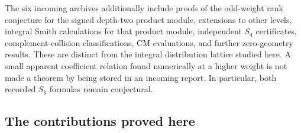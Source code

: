 The six incoming archives additionally include proofs of the odd-weight
rank conjecture for the signed depth-two product module, extensions to
other levels, integral Smith calculations for that product module,
independent $S_4$ certificates, complement-collision classifications,
CM evaluations, and further zero-geometry results. These are distinct
from the integral distribution lattice studied here. A small apparent
coefficient relation found numerically at a higher weight is not made
a theorem by being stored in an incoming report. In particular, both
recorded $S_6$ formulas remain conjectural.

\subsection{The contributions proved here}

